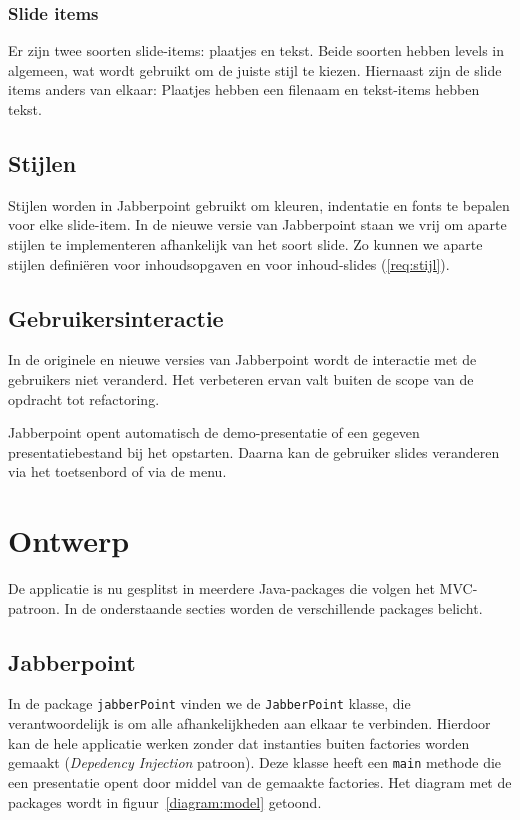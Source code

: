 \documentclass[a4paper]{article}
\newcommand{\reqref}[1]{\ref{req:#1}}
\newcommand{\code}[1]{\lstinline[columns=fixed]{#1}}
\begin{document}
		\subsubsection{Slide items}
			Er zijn twee soorten slide-items: plaatjes en tekst.
			Beide soorten hebben levels in algemeen, wat wordt gebruikt om de juiste stijl te kiezen.
			Hiernaast zijn de slide items anders van elkaar: Plaatjes hebben een filenaam en tekst-items hebben tekst.

		\subsection{Stijlen}
			Stijlen worden in Jabberpoint gebruikt om kleuren, indentatie en fonts te bepalen voor elke slide-item.
			In de nieuwe versie van Jabberpoint staan we vrij om aparte stijlen te implementeren afhankelijk van het soort slide.
			Zo kunnen we aparte stijlen definiëren voor inhoudsopgaven en voor inhoud-slides (\reqref{stijl}).

	\subsection{Gebruikersinteractie}\label{sec:control-analyse}
		In de originele en nieuwe versies van Jabberpoint wordt de interactie met de gebruikers niet veranderd.
		Het verbeteren ervan valt buiten de scope van de opdracht tot refactoring.

		Jabberpoint opent automatisch de demo-presentatie of een gegeven presentatiebestand bij het opstarten.
		Daarna kan de gebruiker slides veranderen via het toetsenbord of via de menu.

\section{Ontwerp}\label{sec:ontwerp}
	De applicatie is nu gesplitst in meerdere Java-packages die volgen het MVC-patroon.
	In de onderstaande secties worden de verschillende packages belicht.

	\subsection{Jabberpoint}
		In de package \code{jabberPoint} vinden we de \code{JabberPoint} klasse, die verantwoordelijk is om alle afhankelijkheden aan elkaar te verbinden.
		Hierdoor kan de hele applicatie werken zonder dat instanties buiten factories worden gemaakt (\textit{Depedency Injection} patroon).
		Deze klasse heeft een \code{main} methode die een presentatie opent door middel van de gemaakte factories.
		Het diagram met de packages wordt in figuur~\ref{diagram:model} getoond.
\end{document}
